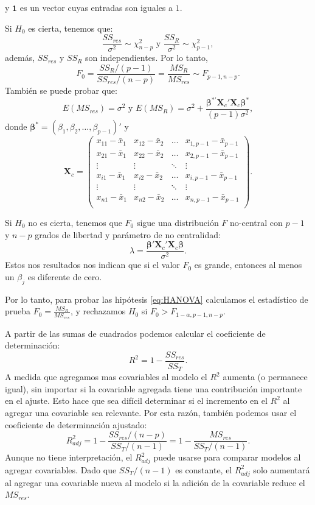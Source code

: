 \documentclass[
]{article}
\begin{document}
y \(\boldsymbol 1\) es un vector cuyas entradas son iguales a \(1\).

Si \(H_{0}\) es cierta, tenemos que:
\[
\frac{SS_{res}}{\sigma^{2}}\sim\chi^{2}_{n-p} \mbox{ y } \frac{SS_{R}}{\sigma^{2}} \sim \chi^{2}_{p-1},
\]
además, \(SS_{res}\) y \(SS_{R}\) son independientes. Por lo tanto,
\[
F_{0} = \frac{SS_{R}/(p-1)}{SS_{res}/(n-p)} = \frac{MS_{R}}{MS_{res}} \sim F_{p-1,n-p}.
\]
También se puede probar que:
\[
E(MS_{res}) =  \sigma^{2} \mbox{ y }E(MS_{R}) =  \sigma^{2} + \frac{\boldsymbol \beta^{*'}\boldsymbol X_{c}'\boldsymbol X_{c}\boldsymbol \beta^{*}}{(p-1)\sigma^{2}},
\]
donde \(\boldsymbol \beta^{*} = (\beta_{1},\beta_{2},\ldots,\beta_{p-1})'\) y
\[
\boldsymbol X_{c} = \begin{pmatrix}
x_{11} - \bar{x}_{1} & x_{12} - \bar{x}_{2} & \ldots & x_{1,p-1} - \bar{x}_{p-1} \\ 
x_{21} - \bar{x}_{1} & x_{22} - \bar{x}_{2} & \ldots & x_{2,p-1} - \bar{x}_{p-1} \\ 
\vdots & \vdots & \ddots & \vdots \\
x_{i1} - \bar{x}_{1} & x_{i2} - \bar{x}_{2} & \ldots & x_{i,p-1} - \bar{x}_{p-1} \\ 
\vdots & \vdots & \ddots & \vdots \\
x_{n1} - \bar{x}_{1} & x_{n2} - \bar{x}_{2} & \ldots & x_{n,p-1} - \bar{x}_{p-1} \\ 
\end{pmatrix}.
\]

Si \(H_{0}\) no es cierta, tenemos que \(F_{0}\) sigue una distribución \(F\) no-central con \(p-1\) y \(n-p\) grados de libertad y parámetro de no centralidad:
\[
\lambda = \frac{\boldsymbol \beta'\boldsymbol X_{c}'\boldsymbol X_{c}\boldsymbol \beta}{\sigma^{2}}.
\]
Estos nos resultados nos indican que si el valor \(F_{0}\) es grande, entonces al menos un \(\beta_{j}\) es diferente de cero.

Por lo tanto, para probar las hipótesis \eqref{eq:HANOVA} calculamos el estadístico de prueba \(F_{0} = \frac{MS_{R}}{MS_{res}}\), y rechazamos \(H_{0}\) si \(F_{0} > F_{1-\alpha,p-1,n-p}\).

A partir de las sumas de cuadrados podemos calcular el coeficiente de determinación:
\[
R^{2} = 1-\frac{SS_{res}}{SS_{T}}.
\]
A medida que agregamos mas covariables al modelo el \(R^{2}\) aumenta (o permanece igual), sin importar si la covariable agregada tiene una contribución importante en el ajuste. Esto hace que sea difícil determinar si el incremento en el \(R^{2}\) al agregar una covariable sea relevante. Por esta razón, también podemos usar el coeficiente de determinación ajustado:
\[
R^{2}_{adj} = 1-\frac{SS_{res}/(n-p)}{SS_{T}/(n-1)} = 1 - \frac{MS_{res}}{SS_T/(n-1)}.
\]
Aunque no tiene interpretación, el \(R^{2}_{adj}\) puede usarse para comparar modelos al agregar covariables. Dado que \(SS_{T}/(n-1)\) es constante, el \(R^{2}_{adj}\) solo aumentará al agregar una covariable nueva al modelo si la adición de la covariable reduce el \(MS_{res}\).
\end{document}
